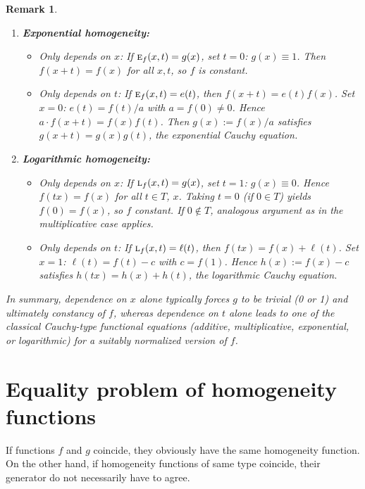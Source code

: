 \documentclass{amsart}
\theoremstyle{plain}
\newtheorem{remark}{Remark}
\numberwithin{equation}{section}
\newcommand{\eh}{\textsc{e}}
\begin{document}
\begin{remark}
\begin{enumerate}
        \item \textbf{Exponential homogeneity:}  
              \begin{itemize}
                  \item \emph{Only depends on \(x\):} If \(\eh_f(x,t) = g(x)\), set \(t=0\): \(g(x) \equiv 1\). Then \(f(x+t) = f(x)\) for all \(x,t\), so \(f\) is constant.
                  \item \emph{Only depends on \(t\):} If \(\eh_f(x,t) = e(t)\), then \(f(x+t) = e(t) f(x)\). Set \(x=0\): \(e(t) = f(t)/a\) with \(a = f(0) \neq 0\). Hence \(a \cdot f(x+t) = f(x) f(t)\). Then \(g(x):= f(x)/a\) satisfies \(g(x+t) = g(x) g(t)\), the exponential Cauchy equation.
              \end{itemize}

        \item \textbf{Logarithmic homogeneity:}  
              \begin{itemize}
                  \item \emph{Only depends on \(x\):} If \(\textsc{l}_f(x,t) = g(x)\), set \(t=1\): \(g(x) \equiv 0\). Hence \(f(tx) = f(x)\) for all \(t \in T\), \(x\). Taking \(t=0\) (if \(0 \in T\)) yields \(f(0) = f(x)\), so \(f\) constant. If \(0 \notin T\), analogous argument as in the multiplicative case applies.
                  \item \emph{Only depends on \(t\):} If \(\textsc{l}_f(x,t) = \ell(t)\), then \(f(tx) = f(x) + \ell(t)\). Set \(x=1\): \(\ell(t) = f(t) - c\) with \(c = f(1)\). Hence \(h(x):= f(x)-c\) satisfies \(h(tx) = h(x) + h(t)\), the logarithmic Cauchy equation.
              \end{itemize}
    \end{enumerate}

    In summary, dependence on \(x\) alone typically forces \(g\) to be trivial (0 or 1) and ultimately constancy of \(f\), whereas dependence on \(t\) alone leads to one of the classical Cauchy-type functional equations (additive, multiplicative, exponential, or logarithmic) for a suitably normalized version of \(f\).
\end{remark}


\section{Equality problem of homogeneity functions}
If functions $f$ and $g$ coincide, they obviously have the same homogeneity function. 
On the other hand, 
if homogeneity functions of same type coincide, their generator
do not necessarily have to agree.
\end{document}
